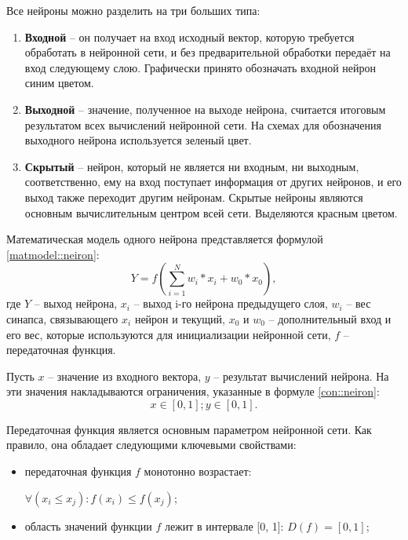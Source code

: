 Все нейроны можно разделить на три больших типа:
\begin{enumerate}
	\item \textbf{Входной} -- он получает на вход исходный вектор, которую требуется обработать в нейронной сети, и без предварительной обработки передаёт на вход следующему слою.
	Графически принято обозначать входной нейрон синим цветом.
	\item \textbf{Выходной} -- значение, полученное на выходе нейрона, считается итоговым результатом всех вычислений нейронной сети.
	На схемах для обозначения выходного нейрона используется зеленый цвет.
	\item \textbf{Скрытый} -- нейрон, который не является ни входным, ни выходным, соответственно, ему на вход поступает информация от других нейронов, и его выход также переходит другим нейронам.
	Скрытые нейроны являются основным вычислительным центром всей сети.
	Выделяются красным цветом.
\end{enumerate}

Математическая модель одного нейрона представляется формулой \eqref{matmodel::neiron}:
\begin{equation}
	\label{matmodel::neiron}
	Y = f(\sum_{i = 1}^{N} w_i * x_i + w_0 * x_0),
\end{equation}
где $Y$ -- выход нейрона, $x_i$ -- выход i-го нейрона предыдущего слоя, $w_i$ -- вес синапса, связывающего $x_i$ нейрон и текущий, $x_0$ и $w_0$ -- дополнительный вход и его вес, которые используются для инициализации нейронной сети, $f$ -- передаточная функция.

Пусть $x$ -- значение из входного вектора, $y$ -- результат вычислений нейрона.
На эти значения накладываются ограничения, указанные в формуле \eqref{con::neiron}:
\begin{equation}
	\label{con::neiron}
	x \in [0, 1]; y \in [0, 1].
\end{equation}

Передаточная функция является основным параметром нейронной сети.
Как правило, она обладает следующими ключевыми свойствами:
\begin{itemize}
	\item передаточная функция $f$ монотонно возрастает:
	
	 $ \forall(x_i \leq x_j) : f(x_i) \leq f(x_j)$;
	\item область значений функции $f$ лежит в интервале [0, 1]: $D(f) = [0, 1]$;
\end{itemize}

